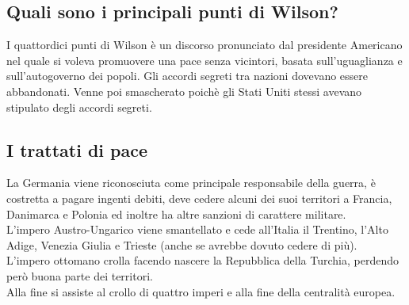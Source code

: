 \documentclass{article}
\begin{document}
\subsection{Quali sono i principali punti di Wilson?}
I quattordici punti di Wilson è un discorso pronunciato dal presidente Americano nel quale si voleva promuovere una pace
senza vicintori, basata sull'uguaglianza e sull'autogoverno dei popoli. Gli accordi segreti tra nazioni dovevano essere
abbandonati. Venne poi smascherato poichè gli Stati Uniti stessi avevano stipulato degli accordi segreti.

\subsection{I trattati di pace}
La Germania viene riconosciuta come principale responsabile della guerra, è costretta a pagare ingenti debiti, deve cedere
alcuni dei suoi territori a Francia, Danimarca e Polonia ed inoltre ha altre sanzioni di carattere militare.\\
L'impero Austro-Ungarico viene smantellato e cede all'Italia il Trentino, l'Alto Adige, Venezia Giulia e Trieste (anche se
avrebbe dovuto cedere di più).\\
L'impero ottomano crolla facendo nascere la Repubblica della Turchia, perdendo però buona parte dei territori.\\
Alla fine si assiste al crollo di quattro imperi e alla fine della centralità europea.
\end{document}
